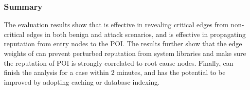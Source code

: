 





\subsubsection{Summary}
The evaluation results show that \tool is effective in revealing critical edges from non-critical edges in both benign and attack scenarios,
and is effective in propagating reputation from entry nodes to the POI.
The results further show that the edge weights of \tool can prevent perturbed reputation from system libraries and make sure the reputation of POI is strongly correlated to root cause nodes.
Finally, \tool can finish the analysis for a case within $2$ minutes, and has the potential to be improved by adopting caching or database indexing.





